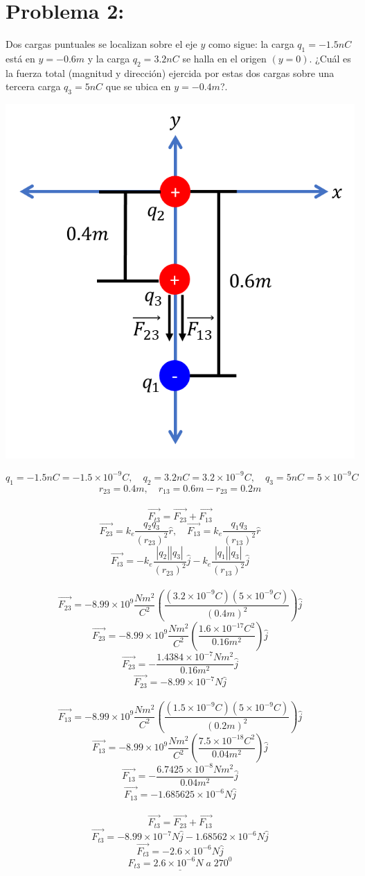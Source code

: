\documentclass[12pt]{article}
\begin{document}
		\section{Problema 2:}\label{sec:Problema2}
			Dos cargas puntuales se localizan sobre el eje $ y $ como sigue: la carga $ q_1 = -1.5nC $
			está en $ y = -0.6m $ y la carga $ q_2 = 3.2nC $ se halla en el origen $ (y = 0) $. ¿Cuál es la
			fuerza total (magnitud y dirección) ejercida por estas dos cargas sobre una tercera
			carga $ q_3 = 5nC $ que se ubica en $ y = -0.4m $?.
			\begin{center}
				\includegraphics[width=.5\textwidth]{Imp2t1.png}
			\end{center}
			$$ q_1 = -1.5nC = -1.5 \times 10^{-9}C, \quad q_2 = 3.2nC = 3.2 \times 10^{-9}C, \quad q_3 = 5nC = 5 \times 10^{-9}C $$
			$$ r_{23} = 0.4m, \quad r_{13} = 0.6m - r_{23} = 0.2m $$ \\
			$$ \vec{F_{t3}} = \vec{F_{23}} + \vec{F_{13}} $$
			$$ \vec{F_{23}} = k_e \frac{q_2q_3}{(r_{23})^2} \hat{r}, \quad \vec{F_{13}} = k_e \frac{q_1q_3}{(r_{13})^2} \hat{r} $$
			$$ \vec{F_{t3}} = -k_e \frac{|q_2||q_3|}{(r_{23})^2} \hat{j} - k_e \frac{|q_1||q_3|}{(r_{13})^2} \hat{j} $$ \\
			$$ \vec{F_{23}} = -8.99 \times 10^9 \frac{Nm^2}{C^2} \left( \frac{(3.2 \times 10^{-9}C)(5 \times 10^{-9}C)}{(0.4m)^2} \right) \hat{j} $$
			$$ \vec{F_{23}} = -8.99 \times 10^9 \frac{Nm^2}{C^2} \left( \frac{1.6 \times 10^{-17}C^2}{0.16m^2} \right) \hat{j} $$
			$$ \vec{F_{23}} = -\frac{1.4384 \times 10^{-7}Nm^2}{0.16m^2} \hat{j} $$
			$$ \vec{F_{23}} = -8.99 \times 10^{-7}N \hat{j} $$ \\
			$$ \vec{F_{13}} = -8.99 \times 10^9 \frac{Nm^2}{C^2} \left( \frac{(1.5 \times 10^{-9}C)(5 \times 10^{-9}C)}{(0.2m)^2} \right) \hat{j} $$
			$$ \vec{F_{13}} = -8.99 \times 10^9 \frac{Nm^2}{C^2} \left( \frac{7.5 \times 10^{-18}C^2}{0.04m^2} \right) \hat{j} $$
			$$ \vec{F_{13}} = -\frac{6.7425 \times 10^{-8}Nm^2}{0.04m^2} \hat{j} $$
			$$ \vec{F_{13}} = -1.685625 \times 10^{-6}N \hat{j} $$ \\
			$$ \vec{F_{t3}} = \vec{F_{23}} + \vec{F_{13}} $$
			$$ \vec{F_{t3}} = -8.99 \times 10^{-7}N \hat{j} - 1.68562 \times 10^{-6}N \hat{j} $$
			$$ \vec{F_{t3}} = -2.6 \times 10^{-6}N \hat{j} $$
			$$ \underline{F_{t3} = 2.6 \times 10^{-6}N \; a \; 270^0} $$ \\
\end{document}
